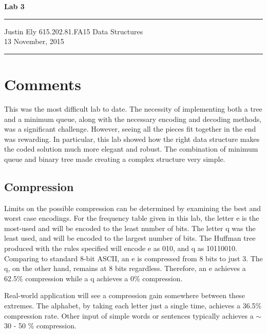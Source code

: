 \documentclass[a4paper,12pt]{article}
\begin{document}
\begin{flushright}

\vspace{1.1cm}

{\bf\Huge Lab 3}

\rule{0.25\linewidth}{0.5pt}

\vspace{0.5cm}
Justin Ely
\linebreak
\newline
\footnotesize{615.202.81.FA15 Data Structures \\}
\vspace{0.5cm}
13 November, 2015
\end{flushright}

\noindent\rule{\linewidth}{1.0pt}


\section{Comments}
This was the most difficult lab to date.  The necessity of implementing both a tree and a minimum queue, along with the necessary encoding and decoding methods, was a significant challenge. However, seeing all the pieces fit together in the end was rewarding.  In particular, this lab showed how the right data structure makes the coded solution much more elegant and robust.  The combination of minimum queue and binary tree made creating a complex structure very simple.

\subsection{Compression}
Limits on the possible compression can be determined by examining the best and worst case encodings.  For the frequency table given in this lab, the letter e is the most-used and will be encoded to the least number of bits.  The letter q was the least used, and will be encoded to the largest number of bits.  The Huffman tree produced with the rules specified will encode e as 010, and q as 10110010.  Comparing to standard 8-bit ASCII, an e is compressed from 8 bits to just 3.  The q, on the other hand, remains at 8 bits regardless.  Therefore, an e achieves a 62.5\% compression while a q achieves a 0\% compression.

Real-world application will see a compression gain somewhere between these extremes.  The alphabet, by taking each letter just a single time, achieves a 36.5\% compression rate. Other input of simple words or sentences typically achieves a $\sim$ 30 - 50 \% compression.
\end{document}
